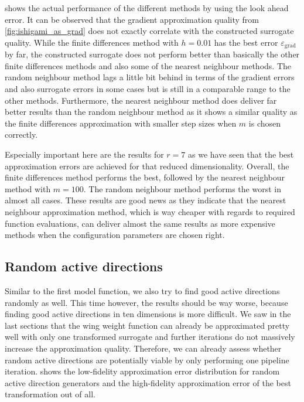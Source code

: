 \documentclass[
  a4paper,  %
  twoside,  %
  bibliography=totoc,
  headsepline,
  cleardoublepage=empty,
  parskip=half,
  draft=false
]{scrbook}
\begin{document}
%
 shows the actual performance of the different methods by using the look ahead error.
It can be observed that the gradient approximation quality from \cref{fig:ishigami_as_grad} does not exactly correlate with the constructed surrogate quality.
While the finite differences method with $h=0.01$ has the best error $\varepsilon_{\mathrm{grad}}$ by far, the constructed surrogate does not perform better than basically the other finite differences methods and also some of the nearest neighbour methods.
The random neighbour method lags a little bit behind in terms of the gradient errors and also surrogate errors in some cases but is still in a comparable range to the other methods.
Furthermore, the nearest neighbour method does deliver far better results than the random neighbour method as it shows a similar quality as the finite differences approximation with smaller step sizes when $m$ is chosen correctly.

Especially important here are the results for $r=7$ as we have seen that the best approximation errors are achieved for that reduced dimensionality.
Overall, the finite differences method performs the best, followed by the nearest neighbour method with $m=100$.
The random neighbour method performs the worst in almost all cases.
These results are good news as they indicate that the nearest neighbour approximation method, which is way cheaper with regards to required function evaluations, can deliver almost the same results as more expensive methods when the configuration parameters are chosen right.


\subsection{Random active directions}

Similar to the first model function, we also try to find good active directions randomly as well.
This time however, the results should be way worse, because finding good active directions in ten dimensions is more difficult.
We saw in the last sections that the wing weight function can already be approximated pretty well with only one transformed surrogate and further iterations do not massively increase the approximation quality.
Therefore, we can already assess whether random active directions are potentially viable by only performing one pipeline iteration.
 shows the low-fidelity approximation error distribution for random active direction generators and the high-fidelity approximation error of the best transformation out of all.
\end{document}
